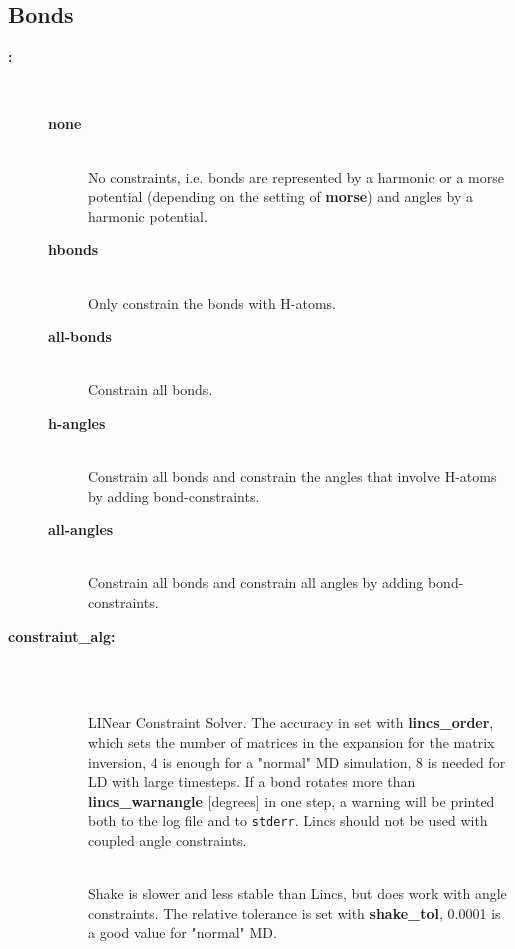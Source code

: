 \subsection{Bonds}
\begin{description}
\item[{\bf {}:}]\mbox{}\\
\vspace{-2ex}\begin{description}
\item[{\bf none}]\mbox{}\\
No constraints, i.e. bonds are represented by a harmonic or a
morse potential (depending on the setting of {\bf morse}) and angles
by a harmonic potential.
\item[{\bf hbonds}]\mbox{}\\
Only constrain the bonds with H-atoms.
\item[{\bf all-bonds}]\mbox{}\\
Constrain all bonds.
\item[{\bf h-angles}]\mbox{}\\
Constrain all bonds and constrain the angles that involve H-atoms
by adding bond-constraints.
\item[{\bf all-angles}]\mbox{}\\
Constrain all bonds and constrain all angles by adding bond-constraints.
\end{description}
\item[{\bf constraint\_alg:}]\mbox{}\\
\vspace{-2ex}\begin{description}
\item[]\mbox{}\\
LINear Constraint Solver. The accuracy in set with
{\bf lincs\_order}, which sets the number of matrices in the expansion
for the matrix inversion, 4 is enough for a "normal" MD simulation, 8 is
needed for LD with large timesteps. If a bond rotates more than
{\bf lincs\_warnangle} [degrees] in one step, 
a warning will be printed both to the log file and to {\tt stderr}. 
Lincs should not be used with coupled angle constraints.
\item[]\mbox{}\\
Shake is slower and less stable than Lincs, but does work with 
angle constraints. 
The relative tolerance is set with {\bf shake\_tol}, 0.0001 is a good value
for "normal" MD. 
\end{description}

\end{description}
